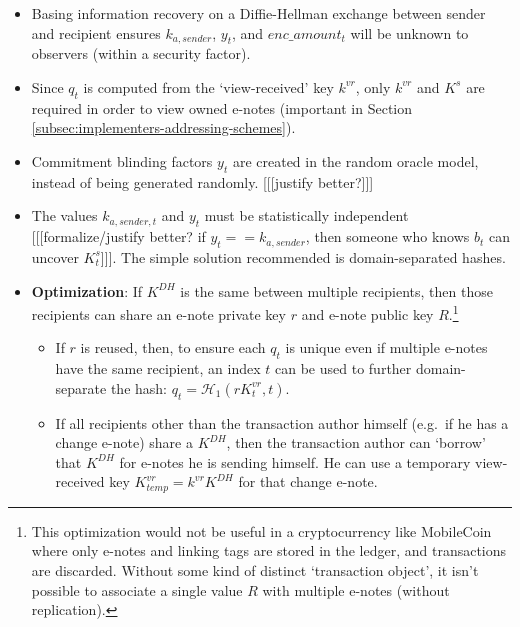 \begin{itemize}
    \item Basing information recovery on a Diffie-Hellman exchange between sender and recipient ensures $k_{a,sender}$, $y_t$, and $enc\_amount_t$ will be unknown to observers (within a security factor).

    \item Since $q_t$ is computed from the `view-received' key $k^{vr}$, only $k^{vr}$ and $K^s$ are required in order to view owned e-notes (important in Section \ref{subsec:implementers-addressing-schemes}).

    \item Commitment blinding factors $y_t$ are created in the random oracle model, instead of being generated randomly. [[[justify better?]]]

    \item The values $k_{a,sender,t}$ and $y_t$ must be statistically independent [[[formalize/justify better? if $y_t == k_{a,sender}$, then someone who knows $b_t$ can uncover $K^s_t$]]]. The simple solution recommended is domain-separated hashes.

    \item \textbf{Optimization}: If $K^{DH}$ is the same between multiple recipients, then those recipients can share an e-note private key $r$ and e-note public key $R$.\footnote{This optimization would not be useful in a cryptocurrency like MobileCoin where only e-notes and linking tags are stored in the ledger, and transactions are discarded. Without some kind of distinct `transaction object', it isn't possible to associate a single value $R$ with multiple e-notes (without replication).}

    \begin{itemize}
        \item If $r$ is reused, then, to ensure each $q_t$ is unique even if multiple e-notes have the same recipient, an index $t$ can be used to further domain-separate the hash: $q_t = \mathcal{H}_1(r K^{vr}_t, t)$.

        \item If all recipients other than the transaction author himself (e.g.\ if he has a change e-note) share a $K^{DH}$, then the transaction author can `borrow' that $K^{DH}$ for e-notes he is sending himself. He can use a temporary view-received key $K^{vr}_{temp} = k^{vr} K^{DH}$ for that change e-note.
    \end{itemize}


\end{itemize}
